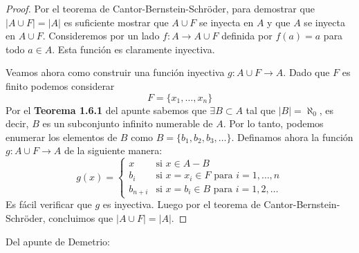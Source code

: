 \documentclass{article}
\theoremstyle{definition}
\begin{document}
\begin{proof}
    Por el teorema de Cantor-Bernstein-Schröder, para demostrar que \(|A\cup F|=|A|\) es suficiente mostrar que \(A\cup F\) se inyecta en \(A\) y que \(A\) se inyecta en \(A\cup F\).
    Consideremos por un lado \( f : A \to A \cup F \) definida por \( f(a) = a \) para todo \( a \in A \). Esta función es claramente inyectiva.

    Veamos ahora como construir una función inyectiva \( g : A \cup F \to A \). Dado que \( F \) es finito podemos considerar \[
        F = \{ x_1 , \ldots , x_n \}
    \]
    Por el \textbf{Teorema 1.6.1} del apunte sabemos que \( \exists B \subset A \) tal que \( |B| = \aleph_0 \), es decir, \(B\) es un subconjunto infinito numerable de \(A\). Por lo tanto, podemos enumerar los elementos de \(B\) como \( B = \{ b_1 , b_2 , b_3 , \ldots \} \).
    Definamos ahora la función \( g : A \cup F \to A \) de la siguiente manera:
    \[
        g(x) = \begin{cases}
            x       & \text{si } x \in A - B                                   \\
            b_i     & \text{si } x = x_i \in F \text{ para } i = 1, \ldots , n \\
            b_{n+i} & \text{si } x = b_i \in B \text{ para } i = 1, 2, \ldots
        \end{cases}
    \]
    Es fácil verificar que \( g \) es inyectiva. Luego por el teorema de Cantor-Bernstein-Schröder, concluimos que \( |A\cup F|=|A| \).
\end{proof}

Del apunte de Demetrio:
\end{document}
